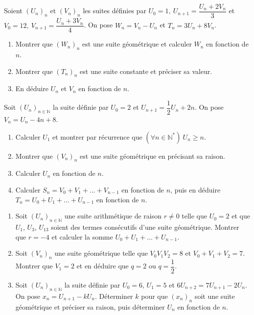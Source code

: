 \fin
{}
Soient $(U_n)_n$ et $(V_n)_n$ les suites définies par
$U_0=1,\ U_{n+1}=\dfrac{U_n+2V_n}{3}$ \quad et \quad $V_0=12,\ V_{n+1}=\dfrac{U_n+3V_n}{4}$.
On pose $W_n=V_n-U_n$ et $T_n=3U_n+8V_n$.
\begin{enumerate}
\item Montrer que $(W_n)_n$ est une suite géométrique et calculer $W_n$ en fonction de $n$.
\item Montrer que $(T_n)_n$ est une suite constante et préciser sa valeur.
\item En déduire $U_n$ et $V_n$ en fonction de $n$.
\end{enumerate}
\fin
{}
Soit $(U_n)_{n\in\mathbb{N}}$ la suite définie par $U_0=2$ et $U_{n+1}=\dfrac12U_n+2n$. On pose $V_n=U_n-4n+8$.
\begin{enumerate}
\item Calculer $U_1$ et montrer par récurrence que $(\forall n\in\mathbb{N}^*)\ U_n\geq n$.
\item Montrer que $(V_n)_n$ est une suite géométrique en précisant sa raison.
\item Calculer $U_n$ en fonction de $n$.
\item Calculer $S_n=V_0+V_1+\dots+V_{n-1}$ en fonction de $n$, puis en déduire $T_n=U_0+U_1+\dots+U_{n-1}$ en fonction de $n$.
\end{enumerate}
\fin
{}
\begin{enumerate}
\item Soit $(U_n)_{n\in\mathbb{N}}$ une suite arithmétique de raison $r\neq0$ telle que $U_0=2$ et que $U_1$, $U_3$, $U_{13}$ soient des termes consécutifs d'une suite géométrique.
Montrer que $r=-4$ et calculer la somme $U_0+U_1+\dots+U_{n-1}$.
\item Soit $(V_n)_n$ une suite géométrique telle que $V_0V_1V_2=8$ et $V_0+V_1+V_2=7$.
Montrer que $V_1=2$ et en déduire que $q=2$ ou $q=\dfrac12$.
\item Soit $(U_n)_{n\in\mathbb{N}}$ la suite définie par $U_0=6$, $U_1=5$ et $6U_{n+2}=7U_{n+1}-2U_n$. On pose $x_n=U_{n+1}-kU_n$.
Déterminer $k$ pour que $(x_n)_n$ soit une suite géométrique et préciser sa raison, puis déterminer $U_n$ en fonction de $n$.
\end{enumerate}
\fin
